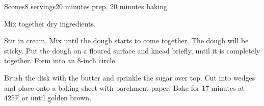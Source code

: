 \documentclass[../Cookbook.tex]{subfiles}
\begin{document}
\begin{recipe}{Scones}{8 servings}{20 minutes prep, 20 minutes baking}

Mix together dry ingredients.

Stir in cream. Mix until the dough starts to come together. The dough will be sticky. Put the dough on a floured surface and knead briefly, until it is completely together. Form into an 8-inch circle.

Brush the disk with the butter and sprinkle the sugar over top. Cut into wedges and place onto a baking sheet with parchment paper. Bake for 17 minutes at 425\0F or until golden brown.

\end{recipe}
\end{document}
